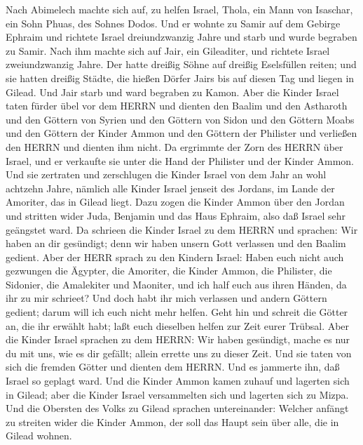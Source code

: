  Nach Abimelech machte sich auf, zu helfen Israel, Thola,
ein Mann von Isaschar, ein Sohn Phuas, des Sohnes Dodos. Und er wohnte
zu Samir auf dem Gebirge Ephraim  und richtete Israel
dreiundzwanzig Jahre und starb und wurde begraben zu Samir. 
Nach ihm machte sich auf Jair, ein Gileaditer, und richtete Israel
zweiundzwanzig Jahre.  Der hatte dreißig Söhne auf dreißig
Eselsfüllen reiten; und sie hatten dreißig Städte, die hießen Dörfer
Jairs bis auf diesen Tag und liegen in Gilead.  Und Jair
starb und ward begraben zu Kamon.  Aber die Kinder Israel
taten fürder übel vor dem HERRN und dienten den Baalim und den Astharoth
und den Göttern von Syrien und den Göttern von Sidon und den Göttern
Moabs und den Göttern der Kinder Ammon und den Göttern der Philister und
verließen den HERRN und dienten ihm nicht.  Da ergrimmte der
Zorn des HERRN über Israel, und er verkaufte sie unter die Hand der
Philister und der Kinder Ammon.  Und sie zertraten und
zerschlugen die Kinder Israel von dem Jahr an wohl achtzehn Jahre,
nämlich alle Kinder Israel jenseit des Jordans, im Lande der Amoriter,
das in Gilead liegt.  Dazu zogen die Kinder Ammon über den
Jordan und stritten wider Juda, Benjamin und das Haus Ephraim, also daß
Israel sehr geängstet ward.  Da schrieen die Kinder Israel
zu dem HERRN und sprachen: Wir haben an dir gesündigt; denn wir haben
unsern Gott verlassen und den Baalim gedient.  Aber der
HERR sprach zu den Kindern Israel: Haben euch nicht auch gezwungen die
Ägypter, die Amoriter, die Kinder Ammon, die Philister, 
die Sidonier, die Amalekiter und Maoniter, und ich half euch aus ihren
Händen, da ihr zu mir schrieet?  Und doch habt ihr mich
verlassen und andern Göttern gedient; darum will ich euch nicht mehr
helfen.  Geht hin und schreit die Götter an, die ihr
erwählt habt; laßt euch dieselben helfen zur Zeit eurer Trübsal.
 Aber die Kinder Israel sprachen zu dem HERRN: Wir haben
gesündigt, mache es nur du mit uns, wie es dir gefällt; allein errette
uns zu dieser Zeit.  Und sie taten von sich die fremden
Götter und dienten dem HERRN. Und es jammerte ihn, daß Israel so geplagt
ward.  Und die Kinder Ammon kamen zuhauf und lagerten sich
in Gilead; aber die Kinder Israel versammelten sich und lagerten sich zu
Mizpa.  Und die Obersten des Volks zu Gilead sprachen
untereinander: Welcher anfängt zu streiten wider die Kinder Ammon, der
soll das Haupt sein über alle, die in Gilead wohnen.


